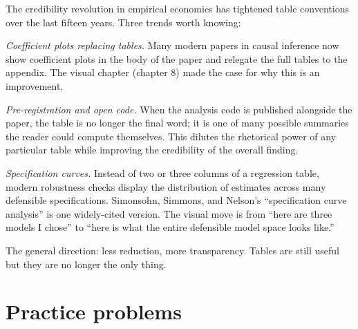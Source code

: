 \documentclass[
  letterpaper,
  11pt,
  twoside,
  openany]{scrbook}
\begin{document}
\begin{tcolorbox}[enhanced jigsaw, arc=.35mm, bottomrule=.15mm, bottomtitle=1mm, breakable, colback=white, colbacktitle=quarto-callout-important-color!10!white, colframe=quarto-callout-important-color-frame, coltitle=black, left=2mm, leftrule=.75mm, opacityback=0, opacitybacktitle=0.6, rightrule=.15mm, title=\textcolor{quarto-callout-important-color}{\faExclamation}\hspace{0.5em}{Frontier note}, titlerule=0mm, toprule=.15mm, toptitle=1mm]

The credibility revolution in empirical economics has tightened table
conventions over the last fifteen years. Three trends worth knowing:

\emph{Coefficient plots replacing tables.} Many modern papers in causal
inference now show coefficient plots in the body of the paper and
relegate the full tables to the appendix. The visual chapter (chapter 8)
made the case for why this is an improvement.

\emph{Pre-registration and open code.} When the analysis code is
published alongside the paper, the table is no longer the final word; it
is one of many possible summaries the reader could compute themselves.
This dilutes the rhetorical power of any particular table while
improving the credibility of the overall finding.

\emph{Specification curves.} Instead of two or three columns of a
regression table, modern robustness checks display the distribution of
estimates across many defensible specifications. Simonsohn, Simmons, and
Nelson's ``specification curve analysis'' is one widely-cited version.
The visual move is from ``here are three models I chose'' to ``here is
what the entire defensible model space looks like.''

The general direction: less reduction, more transparency. Tables are
still useful but they are no longer the only thing.

\end{tcolorbox}

\section{Practice problems}\label{practice-problems-9}
\end{document}
